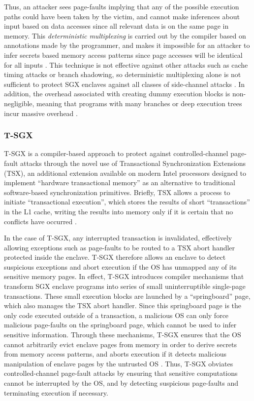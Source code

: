 Thus, an attacker sees page-faults implying that any of the possible execution paths could have been taken by the victim, and cannot make inferences about input based on data accesses since all relevant data is on the same page in memory. This \emph{deterministic multiplexing} is carried out by the compiler based on annotations made by the programmer, and makes it impossible for an attacker to infer secrets based memory access patterns since page accesses will be identical for all inputs \cite{shinde_preventing_2015}. This technique is not effective against other attacks such as cache timing attacks or branch shadowing, so deterministic multiplexing alone is not sufficient to protect SGX enclaves against all classes of side-channel attacks \cite{shinde_preventing_2015, lee_inferring_2017}. In addition, the overhead associated with creating dummy execution blocks is non-negligible, meaning that programs with many branches or deep execution trees incur massive overhead \cite{shinde_preventing_2015}.

\subsubsection{T-SGX}

T-SGX is a compiler-based approach to protect against controlled-channel page-fault attacks through the novel use of Transactional Synchronization Extensions (TSX), an additional extension available on modern Intel processors designed to implement ``hardware transactional memory'' as an alternative to traditional software-based synchronization primitives. Briefly, TSX allows a process to initiate ``transactional execution'', which stores the results of short ``transactions'' in the L1 cache, writing the results into memory only if it is certain that no conflicts have occurred \cite{shih_t-sgx:_2017}. 

In the case of T-SGX, any interrupted transaction is invalidated, effectively allowing exceptions such as page-faults to be routed to a TSX abort handler protected inside the enclave. T-SGX therefore allows an enclave to detect suspicious exceptions and abort execution if the OS has unmapped any of its sensitive memory pages. In effect, T-SGX introduces compiler mechanisms that transform SGX enclave programs into series of small uninterruptible single-page transactions. These small execution blocks are launched by a ``springboard'' page, which also manages the TSX abort handler. Since this springboard page is the only code executed outside of a transaction, a malicious OS can only force malicious page-faults on the springboard page, which cannot be used to infer sensitive information. Through these mechanisms, T-SGX ensures that the OS cannot arbitrarily evict enclave pages from memory in order to derive secrets from memory access patterns, and aborts execution if it detects malicious manipulation of enclave pages by the untrusted OS \cite{shih_t-sgx:_2017}. Thus, T-SGX obviates controlled-channel page-fault attacks by ensuring that sensitive computations cannot be interrupted by the OS, and by detecting suspicious page-faults and terminating execution if necessary. 

